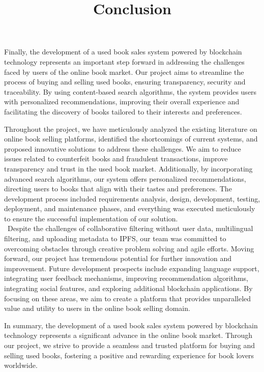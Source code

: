 \documentclass{article}
\title{Conclusion}
\author{}
\date{}
\begin{document}
\maketitle

Finally, the development of a used book sales system powered by blockchain technology represents an important step forward in addressing the challenges faced by users of the online book market. Our project aims to streamline the process of buying and selling used books, ensuring transparency, security and traceability.
By using content-based search algorithms, the system provides users with personalized recommendations, improving their overall experience and facilitating the discovery of books tailored to their interests and preferences.

Throughout the project, we have meticulously analyzed the existing literature on online book selling platforms, identified the shortcomings of current systems, and proposed innovative solutions to address these challenges. We aim to reduce issues related to counterfeit books and fraudulent transactions, improve transparency and trust in the used book market.
Additionally, by incorporating advanced search algorithms, our system offers personalized recommendations, directing users to books that align with their tastes and preferences.
The development process included requirements analysis, design, development, testing, deployment, and maintenance phases, and everything was executed meticulously to ensure the successful implementation of our solution.
\\\
Despite the challenges of collaborative filtering without user data, multilingual filtering, and uploading metadata to IPFS, our team was committed to overcoming obstacles through creative problem solving and agile efforts.
Moving forward, our project has tremendous potential for further innovation and improvement. Future development prospects include expanding language support, integrating user feedback mechanisms, improving recommendation algorithms, integrating social features, and exploring additional blockchain applications.
By focusing on these areas, we aim to create a platform that provides unparalleled value and utility to users in the online book selling domain.



In summary, the development of a used book sales system powered by blockchain technology represents a significant advance in the online book market.
Through our project, we strive to provide a seamless and trusted platform for buying and selling used books, fostering a positive and rewarding experience for book lovers worldwide.
\end{document}
